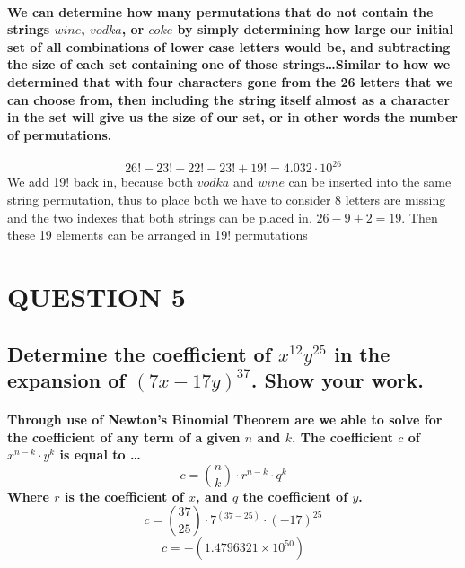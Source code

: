 \documentclass{amsart}
\theoremstyle{definition}
\theoremstyle{remark}
\numberwithin{equation}{section}
\begin{document}
\paragraph{
\newline
We can determine how many permutations that \textbf{do not} contain the strings $wine$, $vodka$, or $coke$ by simply determining how large our initial set of all combinations of lower case letters would be, and subtracting the size of each set containing one of those strings\dots\newline\newline Similar to how we determined that with four characters gone from the 26 letters that we can choose from, then including the string itself almost as a character in the set will give us the size of our set, or in other words the number of permutations.\newline
}
$$26! - 23! - 22! - 23! + 19! = 4.032 \cdot 10^{26}$$\newline We add 19! back in, because both $vodka$ and $wine$ can be inserted into the same string permutation, thus to place both we have to consider 8 letters are missing and the two indexes that both strings can be placed in. $26-9+2 = 19$. Then these 19 elements can be arranged in 19! permutations
\section*{QUESTION 5}
\subsection*{
Determine the coefficient of $x^{12} y^{25}$ in the expansion of 
$(7x - 17y)^{37}$. Show your work. }

\paragraph{\newline
 Through use of Newton's Binomial Theorem are we able to solve for the coefficient of any term of a given $n$ and $k$. The coefficient $c$ of $x^{n-k}\cdot y^{k}$ is equal to \dots \newline $$ c = {n \choose k} \cdot r^{n-k} \cdot q^{k}$$ \newline Where $r$ is the coefficient of $x$, and $q$ the coefficient of $y$. \newline
 $$ c = {37 \choose 25} \cdot 7^{(37-25)} \cdot (-17)^{25}$$ $$ c = -(1.4796321 \times10^{50})$$
}
\end{document}

